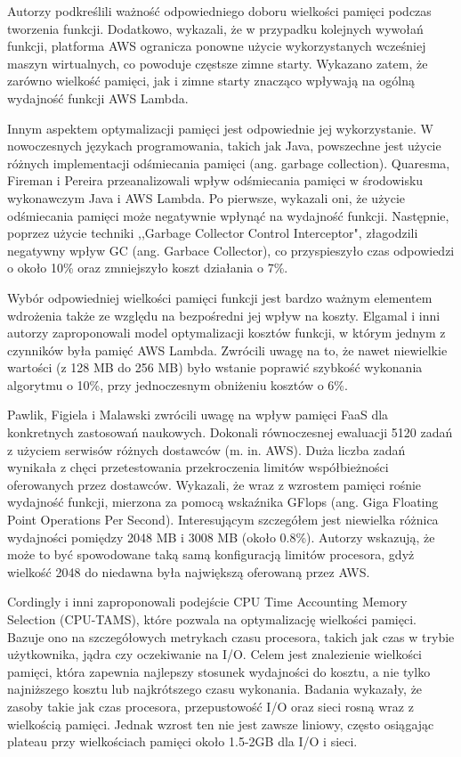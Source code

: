 Autorzy podkreślili ważność odpowiedniego doboru wielkości pamięci podczas tworzenia funkcji. 
Dodatkowo, wykazali, że w przypadku kolejnych wywołań funkcji, platforma AWS ogranicza ponowne użycie wykorzystanych wcześniej maszyn wirtualnych, co powoduje częstsze zimne starty.
Wykazano zatem, że zarówno wielkość pamięci, jak i zimne starty znacząco wpływają na ogólną wydajność funkcji AWS Lambda.

Innym aspektem optymalizacji pamięci jest odpowiednie jej wykorzystanie. 
W nowoczesnych językach programowania, takich jak Java, powszechne jest użycie różnych implementacji odśmiecania pamięci (ang. garbage collection). 
Quaresma, Fireman i Pereira \cite{9235063} przeanalizowali wpływ odśmiecania pamięci w środowisku wykonawczym Java i AWS Lambda. 
Po pierwsze, wykazali oni, że użycie odśmiecania pamięci może negatywnie wpłynąć na wydajność funkcji. 
Następnie, poprzez użycie techniki  ,,Garbage Collector Control Interceptor", złagodzili negatywny wpływ GC (ang. Garbace Collector), co przyspieszyło czas odpowiedzi o około 10\% oraz zmniejszyło koszt działania o 7\%. 

Wybór odpowiedniej wielkości pamięci funkcji jest bardzo ważnym elementem wdrożenia także ze względu na bezpośredni jej wpływ na koszty. Elgamal i inni autorzy \cite{8567674} zaproponowali model optymalizacji kosztów funkcji, w którym jednym z czynników była pamięć AWS Lambda. 
Zwrócili uwagę na to, że nawet niewielkie wartości (z 128 MB do 256 MB) było wstanie poprawić szybkość wykonania algorytmu o 10\%, przy jednoczesnym obniżeniu kosztów o 6\%.

Pawlik, Figiela i Malawski \cite{pawlik2019performanceconsiderationsexecutionlarge} zwrócili uwagę na wpływ pamięci FaaS dla konkretnych zastosowań naukowych. 
Dokonali równoczesnej ewaluacji 5120 zadań z użyciem serwisów różnych dostawców (m. in. AWS). 
Duża liczba zadań wynikała z chęci przetestowania przekroczenia limitów współbieżności oferowanych przez dostawców. 
Wykazali, że wraz z wzrostem pamięci rośnie wydajność funkcji, mierzona za pomocą wskaźnika GFlops (ang. Giga Floating Point Operations Per Second). 
Interesującym szczegółem jest niewielka różnica wydajności pomiędzy 2048 MB i 3008 MB (około 0.8\%). 
Autorzy wskazują, że może to być spowodowane taką samą konfiguracją limitów procesora, gdyż wielkość 2048 do niedawna była największą oferowaną przez AWS.

Cordingly i inni \cite{9946331} zaproponowali podejście CPU Time Accounting Memory Selection (CPU-TAMS), które pozwala na optymalizację wielkości pamięci.
Bazuje ono na szczegółowych metrykach czasu procesora, takich jak czas w trybie użytkownika, jądra czy oczekiwanie na I/O.
Celem jest znalezienie wielkości pamięci, która zapewnia najlepszy stosunek wydajności do kosztu, a nie tylko najniższego kosztu lub najkrótszego czasu wykonania.
Badania wykazały, że zasoby takie jak czas procesora, przepustowość I/O oraz sieci rosną wraz z wielkością pamięci.
Jednak wzrost ten nie jest zawsze liniowy, często osiągając plateau przy wielkościach pamięci około 1.5-2GB dla I/O i sieci. 

